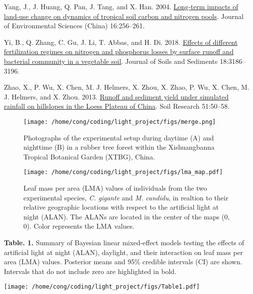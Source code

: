 \documentclass[
  12pt,
  letterpaper,
  DIV=11,
  numbers=noendperiod]{scrartcl}
\newlength{\cslhangindent}
\newlength{\cslentryspacingunit} %
\newenvironment{CSLReferences}[2] %
 {%
  \setlength{\parindent}{0pt}
  \ifodd #1
  \let\oldpar\par
  \def\par{\hangindent=\cslhangindent\oldpar}
  \fi
  \setlength{\parskip}{#2\cslentryspacingunit}
 }%
 {}
\begin{document}
\begin{CSLReferences}{1}{0}
\leavevmode{}%
Yang, J., J. Huang, Q. Pan, J. Tang, and X. Han. 2004.
\href{https://www.ncbi.nlm.nih.gov/pubmed/15137650}{Long-term impacts of
land-use change on dynamics of tropical soil carbon and nitrogen pools}.
Journal of Environmental Sciences (China) 16:256--261.

\leavevmode{}%
Yi, B., Q. Zhang, C. Gu, J. Li, T. Abbas, and H. Di. 2018.
\href{https://doi.org/10.1007/s11368-018-1991-6}{Effects of different
fertilization regimes on nitrogen and phosphorus losses by surface
runoff and bacterial community in a vegetable soil}. Journal of Soils
and Sediments 18:3186--3196.

\leavevmode{}%
Zhao, X., P. Wu, X. Chen, M. J. Helmers, X. Zhou, X. Zhao, P. Wu, X.
Chen, M. J. Helmers, and X. Zhou. 2013.
\href{https://doi.org/10.1071/SR12239}{Runoff and sediment yield under
simulated rainfall on hillslopes in the {Loess Plateau} of {China}}.
Soil Research 51:50--58.

\end{CSLReferences}

\newpage

\begin{figure}

{\centering \texttt{[image: /home/cong/coding/light\_project/figs/merge.png]}

}

\caption{\label{fig-alan}Photographs of the experimental setup during
daytime (A) and nighttime (B) in a rubber tree forest within the
Xishuangbanna Tropical Botanical Garden (XTBG), China.}

\end{figure}

\newpage

\begin{figure}

{\centering \texttt{[image: /home/cong/coding/light\_project/figs/lma\_map.pdf]}

}

\caption{\label{fig-LMA}Leaf mass per area (LMA) values of individuals
from the two experimental species, \emph{C. gigante} and \emph{M.
candidu}, in realtion to their relative geographic locations with
respect to the artificial light at night (ALAN). The ALANs are located
in the center of the maps (0, 0). Color represents the LMA values.}

\end{figure}

\newpage

\textbf{Table. 1.} Summary of Bayesian linear mixed-effect models
testing the effects of artificial light at night (ALAN), daylight, and
their interaction on leaf mass per area (LMA) values. Posterior means
and 95\% credible intervals (CI) are shown. Intervals that do not
include zero are highlighted in bold.

\texttt{[image: /home/cong/coding/light\_project/figs/Table1.pdf]}
\end{document}
